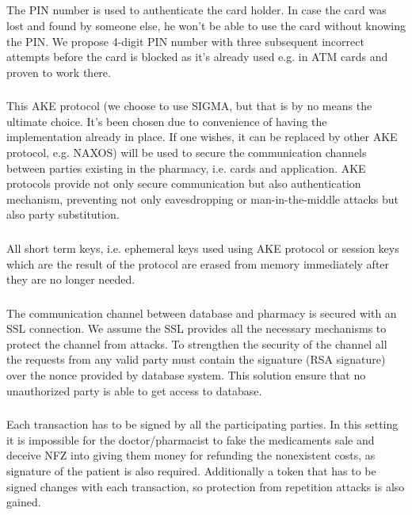 \subsection{}

\subsubsection{}
The PIN number is used to authenticate the card holder. In case the card was lost and found by someone else, he won't be able to use the card without knowing the PIN. We propose 4-digit PIN number with three subsequent incorrect attempts before the card is blocked as it's already used e.g. in ATM cards and proven to work there.

\subsubsection{}
This AKE protocol (we choose to use SIGMA, but that is by no means the ultimate choice. It's been chosen due to convenience of having the implementation already in place. If one wishes, it can be replaced by other AKE protocol, e.g. NAXOS) will be used to secure the communication channels between parties existing in the pharmacy, i.e. cards and application. AKE protocols provide not only secure communication but also authentication mechanism, preventing not only eavesdropping or man-in-the-middle attacks but also party substitution.

\subsubsection{}
All short term keys, i.e. ephemeral keys used using AKE protocol or session keys which are the result of the protocol are erased from memory immediately after they are no longer needed.

\subsubsection{}
The communication channel between database and pharmacy is secured with an SSL connection. We assume the SSL provides all the necessary mechanisms to protect the channel from attacks. To strengthen the security of the channel all the requests from any valid party must contain the signature (RSA signature) over the nonce provided by database system. This solution ensure that no unauthorized party is able to get access to database.

\subsubsection{}
Each transaction has to be signed by all the participating parties. In this setting it is impossible for the doctor/pharmacist to fake the medicaments sale and deceive NFZ into giving them money for refunding the nonexistent costs, as signature of the patient is also required. Additionally a token that has to be signed changes with each transaction, so protection from repetition attacks is also gained.
